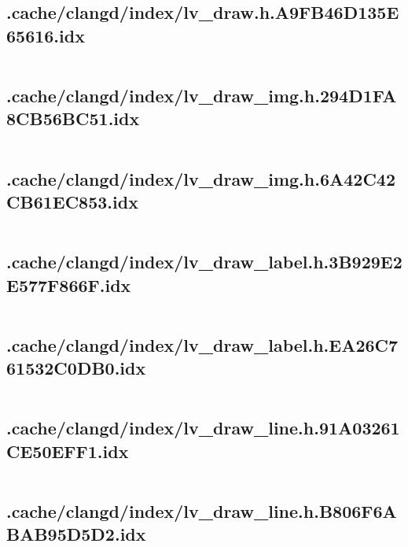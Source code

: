 \subsection{.cache/clangd/index/lv_draw.h.A9FB46D135E65616.idx}
\inputminted[linenos,tabsize=2,breaklines, breakanywhere]{c}{lv_draw.h.A9FB46D135E65616.idx}
\pagebreak

\subsection{.cache/clangd/index/lv_draw_img.h.294D1FA8CB56BC51.idx}
\inputminted[linenos,tabsize=2,breaklines, breakanywhere]{c}{lv_draw_img.h.294D1FA8CB56BC51.idx}
\pagebreak

\subsection{.cache/clangd/index/lv_draw_img.h.6A42C42CB61EC853.idx}
\inputminted[linenos,tabsize=2,breaklines, breakanywhere]{c}{lv_draw_img.h.6A42C42CB61EC853.idx}
\pagebreak

\subsection{.cache/clangd/index/lv_draw_label.h.3B929E2E577F866F.idx}
\inputminted[linenos,tabsize=2,breaklines, breakanywhere]{c}{lv_draw_label.h.3B929E2E577F866F.idx}
\pagebreak

\subsection{.cache/clangd/index/lv_draw_label.h.EA26C761532C0DB0.idx}
\inputminted[linenos,tabsize=2,breaklines, breakanywhere]{c}{lv_draw_label.h.EA26C761532C0DB0.idx}
\pagebreak

\subsection{.cache/clangd/index/lv_draw_line.h.91A03261CE50EFF1.idx}
\inputminted[linenos,tabsize=2,breaklines, breakanywhere]{c}{lv_draw_line.h.91A03261CE50EFF1.idx}
\pagebreak

\subsection{.cache/clangd/index/lv_draw_line.h.B806F6ABAB95D5D2.idx}
\inputminted[linenos,tabsize=2,breaklines, breakanywhere]{c}{lv_draw_line.h.B806F6ABAB95D5D2.idx}
\pagebreak

